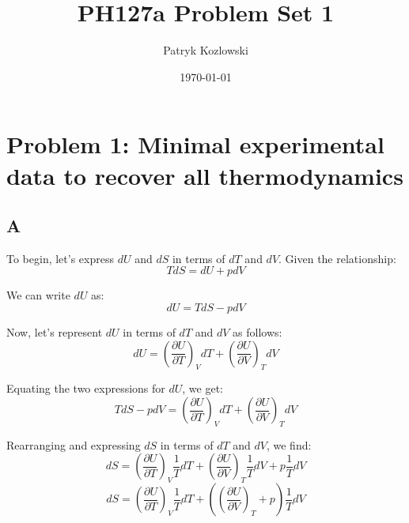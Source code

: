 \documentclass{article}
\date{\today}
\title{PH127a Problem Set 1}
\author{Patryk Kozlowski}
\begin{document}
\maketitle
\section{Problem 1: Minimal experimental data to recover all thermodynamics}
\subsection{A}
To begin, let's express \(dU\) and \(dS\) in terms of \(dT\) and \(dV\). Given the relationship:
\begin{equation}
T dS = dU + p dV
\end{equation}

We can write \(dU\) as:
\begin{equation}
dU = T dS - p dV
\end{equation}

Now, let's represent \(dU\) in terms of \(dT\) and \(dV\) as follows:
\begin{equation}
dU = \left( \frac{\partial U}{\partial T} \right)_V dT + \left( \frac{\partial U}{\partial V} \right)_T dV
\end{equation}

Equating the two expressions for \(dU\), we get:
\begin{equation}
T dS - p dV = \left( \frac{\partial U}{\partial T} \right)_V dT + \left( \frac{\partial U}{\partial V} \right)_T dV
\end{equation}

Rearranging and expressing \(dS\) in terms of \(dT\) and \(dV\), we find:
\begin{equation}
dS = \left( \frac{\partial U}{\partial T} \right)_V \frac{1}{T} dT + \left( \frac{\partial U}{\partial V} \right)_T \frac{1}{T} dV + p \frac{1}{T} dV
\end{equation}
\begin{equation}
dS = \left( \frac{\partial U}{\partial T} \right)_V \frac{1}{T} dT + \left( \left( \frac{\partial U}{\partial V} \right)_T + p \right) \frac{1}{T} dV
\end{equation}
\end{document}
